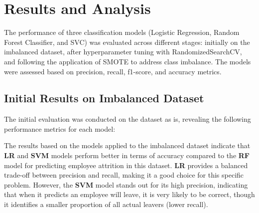 \documentclass[12pt, twocolumn]{article}
\begin{document}
	\section{Results and Analysis}
	
	The performance of three classification models (Logistic Regression, Random Forest Classifier, and SVC) was evaluated across different stages: initially on the imbalanced dataset, after hyperparameter tuning with RandomizedSearchCV, and following the application of SMOTE to address class imbalance. The models were assessed based on precision, recall, f1-score, and accuracy metrics.
	
	\subsection{Initial Results on Imbalanced Dataset}
	
	The initial evaluation was conducted on the dataset as is, revealing the following performance metrics for each model:
	
	\begin{table}[H]
		\centering
		\caption{Class 1 Performance Metrics on Imbalanced Dataset}
		\label{tab:imbalance-results-class1}
	\end{table}
	
	
	
	
	The results based on the models applied to the imbalanced dataset indicate that \textbf{LR} and \textbf{SVM} models perform better in terms of accuracy compared to the \textbf{RF} model for predicting employee attrition in this dataset. \textbf{LR} provides a balanced trade-off between precision and recall, making it a good choice for this specific problem. However, the \textbf{SVM} model stands out for its high precision, indicating that when it predicts an employee will leave, it is very likely to be correct, though it identifies a smaller proportion of all actual leavers (lower recall).
	
\end{document}
